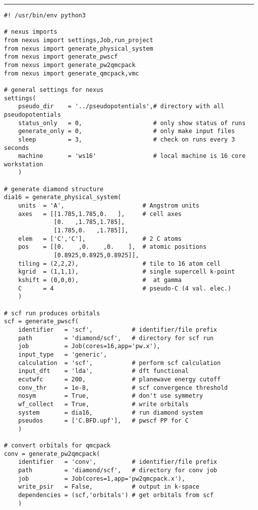 \documentclass[oneside,11pt]{memoir}
\numberwithin{equation}{section}
\newcommand{\HRule}{\rule{\linewidth}{0.5mm}}
\begin{document}
\HRule
\begin{verbatim}
#! /usr/bin/env python3

# nexus imports
from nexus import settings,Job,run_project
from nexus import generate_physical_system
from nexus import generate_pwscf
from nexus import generate_pw2qmcpack
from nexus import generate_qmcpack,vmc

# general settings for nexus
settings(
    pseudo_dir    = '../pseudopotentials',# directory with all pseudopotentials
    status_only   = 0,                    # only show status of runs
    generate_only = 0,                    # only make input files
    sleep         = 3,                    # check on runs every 3 seconds
    machine       = 'ws16'                # local machine is 16 core workstation
    )

# generate diamond structure
dia16 = generate_physical_system(
    units  = 'A',                      # Angstrom units
    axes   = [[1.785,1.785,0.   ],     # cell axes
              [0.   ,1.785,1.785],
              [1.785,0.   ,1.785]],
    elem   = ['C','C'],                # 2 C atoms
    pos    = [[0.    ,0.    ,0.    ],  # atomic positions
              [0.8925,0.8925,0.8925]],
    tiling = (2,2,2),                  # tile to 16 atom cell
    kgrid  = (1,1,1),                  # single supercell k-point
    kshift = (0,0,0),                  #  at gamma
    C      = 4                         # pseudo-C (4 val. elec.)
    )
              
# scf run produces orbitals
scf = generate_pwscf(
    identifier   = 'scf',           # identifier/file prefix
    path         = 'diamond/scf',   # directory for scf run
    job          = Job(cores=16,app='pw.x'),
    input_type   = 'generic',
    calculation  = 'scf',           # perform scf calculation
    input_dft    = 'lda',           # dft functional
    ecutwfc      = 200,             # planewave energy cutoff
    conv_thr     = 1e-8,            # scf convergence threshold
    nosym        = True,            # don't use symmetry
    wf_collect   = True,            # write orbitals
    system       = dia16,           # run diamond system
    pseudos      = ['C.BFD.upf'],   # pwscf PP for C
    )

# convert orbitals for qmcpack
conv = generate_pw2qmcpack(
    identifier   = 'conv',          # identifier/file prefix
    path         = 'diamond/scf',   # directory for conv job
    job          = Job(cores=1,app='pw2qmcpack.x'),
    write_psir   = False,           # output in k-space
    dependencies = (scf,'orbitals') # get orbitals from scf
    )


\end{verbatim}
\end{document}
